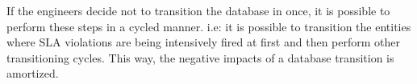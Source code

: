 If the engineers decide not to transition the database in once, it is possible to perform these steps in a cycled manner. i.e: it is possible to transition the entities where SLA violations are being intensively fired at first and then perform other transitioning cycles. This way, the negative impacts of a database transition is amortized. 
